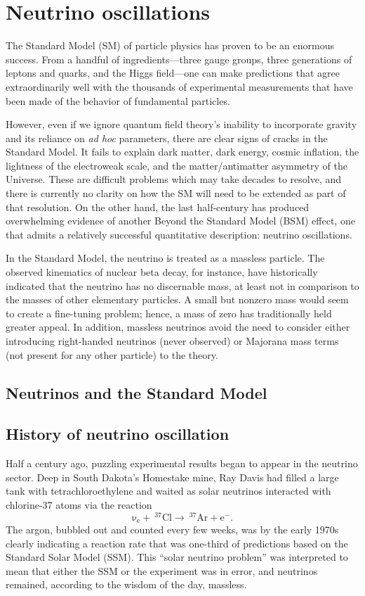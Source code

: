 \documentclass[../thesis.tex]{subfiles}
\begin{document}
\chapter{Neutrino oscillations}
\label{chap:intro}

The Standard Model (SM) of particle physics has proven to be an enormous success. From a handful of ingredients---three gauge groups, three generations of leptons and quarks, and the Higgs field---one can make predictions that agree extraordinarily well with the thousands of experimental measurements that have been made of the behavior of fundamental particles.

However, even if we ignore quantum field theory's inability to incorporate gravity and its reliance on \emph{ad hoc} parameters, there are clear signs of cracks in the Standard Model. It fails to explain dark matter, dark energy, cosmic inflation, the lightness of the electroweak scale, and the matter/antimatter asymmetry of the Universe. These are difficult problems which may take decades to resolve, and there is currently no clarity on how the SM will need to be extended as part of that resolution. On the other hand, the last half-century has produced overwhelming evidence of another Beyond the Standard Model (BSM) effect, one that admits a relatively successful quantitative description: neutrino oscillations.

In the Standard Model, the neutrino is treated as a massless particle. The observed kinematics of nuclear beta decay, for instance, have historically indicated that the neutrino has no discernable mass, at least not in comparison to the masses of other elementary particles. A small but nonzero mass would seem to create a fine-tuning problem; hence, a mass of zero has traditionally held greater appeal. In addition, massless neutrinos avoid the need to consider either introducing right-handed neutrinos (never observed) or Majorana mass terms (not present for any other particle) to the theory.

\section{Neutrinos and the Standard Model}
\label{sec:neuAndSM}

\section{History of neutrino oscillation}
\label{sec:history}

Half a century ago, puzzling experimental results began to appear in the neutrino sector. Deep in South Dakota's Homestake mine, Ray Davis had filled a large tank with tetrachloroethylene and waited as solar neutrinos interacted with chlorine-37 atoms via the reaction
\[ \mathrm{\nu_e + \ ^{37}Cl \longrightarrow \ ^{37}Ar + e^-.} \]
The argon, bubbled out and counted every few weeks, was by the early 1970s clearly indicating a reaction rate that was one-third of predictions based on the Standard Solar Model (SSM). This ``solar neutrino problem'' was interpreted to mean that either the SSM or the experiment was in error, and neutrinos remained, according to the wisdom of the day, massless.
\end{document}
